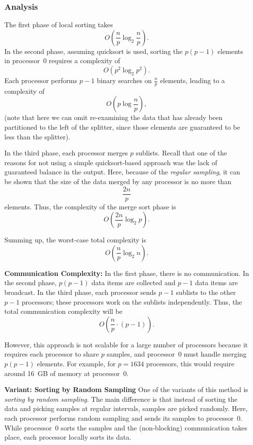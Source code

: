 \documentclass[12pt]{book}
\begin{document}
\subsubsection{Analysis}

The first phase of local sorting takes 
\[
O\left(\frac{n}{p} \log_2 \frac{n}{p}\right).
\]
In the second phase, assuming quicksort is used, sorting the $p(p-1)$ elements in processor~0 requires a complexity of 
\[
O\left(p^2 \log_2 p^2\right).
\]
Each processor performs $p-1$ binary searches on $\frac{n}{p}$ elements, leading to a complexity of 
\[
O\left(p \log \frac{n}{p}\right),
\]
(note that here we can omit re-examining the data that has already been partitioned to the left of the splitter, since those elements are guaranteed to be less than the splitter).

In the third phase, each processor merges $p$ sublists.  
Recall that one of the reasons for not using a simple quicksort-based approach was the lack of guaranteed balance in the output.  
Here, because of the \emph{regular sampling}, it can be shown that the size of the data merged by any processor is no more than 
\[
\frac{2n}{p}
\]
elements. Thus, the complexity of the merge sort phase is 
\[
O\left(\frac{2n}{p} \log_2 p\right).
\]

Summing up, the worst-case total complexity is 
\[
O\left(\frac{n}{p} \log_2 n\right).
\]

\medskip
\noindent
\textbf{Communication Complexity:}  
In the first phase, there is no communication.  
In the second phase, $p(p-1)$ data items are collected and $p-1$ data items are broadcast.  
In the third phase, each processor sends $p-1$ sublists to the other $p-1$ processors; these processors work on the sublists independently.  
Thus, the total communication complexity will be 
\[
O\left(\frac{n}{p} \cdot (p-1)\right).
\]

\medskip
\noindent
However, this approach is not scalable for a large number of processors because it requires each processor to share $p$ samples, and processor~0 must handle merging $p(p-1)$ elements. For example, for $p=1634$ processors, this would require around 16~GB of memory at processor~0.

\medskip
\noindent
\textbf{Variant: Sorting by Random Sampling}  
One of the variants of this method is \emph{sorting by random sampling}.  
The main difference is that instead of sorting the data and picking samples at regular intervals, samples are picked randomly.  
Here, each processor performs random sampling and sends its samples to processor~0.  
While processor~0 sorts the samples and the (non-blocking) communication takes place, each processor locally sorts its data.  
\end{document}
